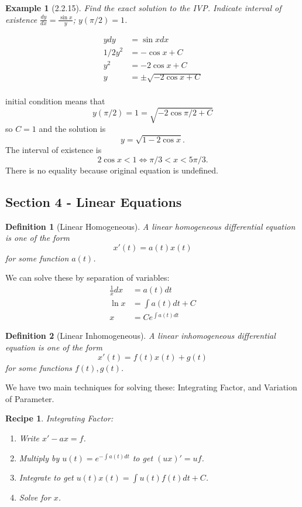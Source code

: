 \documentclass[14pt]{article}
\newtheorem{defn}{Definition}
\newtheorem{re}{Recipe}
\newtheorem{ex}{Example}
\begin{document}
\begin{ex}[2.2.15] Find the exact solution to the IVP. Indicate interval of existence $ \frac{dy}{dx} = \frac{\sin x}{y}$; $y(\pi / 2 ) = 1$.\end{ex}

\begin{align*}
ydy &= \sin x dx \\
1/2 y^2 &= -\cos x + C \\
y^2 &= -2 \cos x + C \\
y &= \pm \sqrt{-2 \cos x + C } \\ 
\end{align*}

initial condition means that 
\[y(\pi /2 )  = 1 = \sqrt{-2 \cos \pi / 2 + C}\]
so $C =1$ and the solution is 
\[y = \sqrt{1 - 2 \cos x}.\]
The interval of existence is 
\[2 \cos x < 1 \Leftrightarrow \pi / 3 < x < 5 \pi /3 .\]
There is no equality because original equation is undefined.

\subsection{Section 4 - Linear Equations}

\begin{defn}[Linear Homogeneous] A \emph{linear homogeneous} differential equation is one of the form \[x'(t) = a(t) x(t) \] for some function $a(t)$. \end{defn}

We can solve these by separation of variables:
\begin{align*} 
\frac{1}{x} dx &= a(t) dt \\ 
\ln x &= \int a(t) dt + C \\
x &= C e^{\int a(t) dt}
\end{align*}

\begin{defn}[Linear Inhomogeneous] A \emph{linear inhomogeneous} differential equation is one of the form \[x'(t) = f(t) x(t) + g(t) \] for some functions $f(t), g(t)$. \end{defn}

We have two main techniques for solving these: Integrating Factor, and Variation of Parameter.

\begin{re} Integrating Factor:
\begin{enumerate} 
\item Write $x' - ax = f$.
\item Multiply by $u(t) = e^{- \int a(t) dt}$ to get $ (u x)' = uf $.
\item Integrate to get $u(t) x(t) = \int u(t) f(t) dt + C $.
\item Solve for $x$. 
\end{enumerate}
\end{re}
\end{document}
